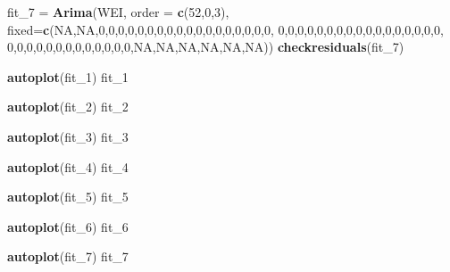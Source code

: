 \documentclass[]{article}
\newenvironment{Shaded}{\begin{snugshade}}{\end{snugshade}}
\newcommand{\KeywordTok}[1]{\textcolor[rgb]{0.13,0.29,0.53}{\textbf{#1}}}
\newcommand{\DataTypeTok}[1]{\textcolor[rgb]{0.13,0.29,0.53}{#1}}
\newcommand{\DecValTok}[1]{\textcolor[rgb]{0.00,0.00,0.81}{#1}}
\newcommand{\StringTok}[1]{\textcolor[rgb]{0.31,0.60,0.02}{#1}}
\newcommand{\OtherTok}[1]{\textcolor[rgb]{0.56,0.35,0.01}{#1}}
\newcommand{\NormalTok}[1]{#1}
\begin{document}
\begin{Shaded}
\begin{Highlighting}[]
\NormalTok{fit_}\DecValTok{7}\NormalTok{ =}\StringTok{ }\KeywordTok{Arima}\NormalTok{(WEI, }\DataTypeTok{order =} \KeywordTok{c}\NormalTok{(}\DecValTok{52}\NormalTok{,}\DecValTok{0}\NormalTok{,}\DecValTok{3}\NormalTok{), }
              \DataTypeTok{fixed=}\KeywordTok{c}\NormalTok{(}\OtherTok{NA}\NormalTok{,}\OtherTok{NA}\NormalTok{,}\DecValTok{0}\NormalTok{,}\DecValTok{0}\NormalTok{,}\DecValTok{0}\NormalTok{,}\DecValTok{0}\NormalTok{,}\DecValTok{0}\NormalTok{,}\DecValTok{0}\NormalTok{,}\DecValTok{0}\NormalTok{,}\DecValTok{0}\NormalTok{,}\DecValTok{0}\NormalTok{,}\DecValTok{0}\NormalTok{,}\DecValTok{0}\NormalTok{,}\DecValTok{0}\NormalTok{,}\DecValTok{0}\NormalTok{,}\DecValTok{0}\NormalTok{,}\DecValTok{0}\NormalTok{,}\DecValTok{0}\NormalTok{,}\DecValTok{0}\NormalTok{,}\DecValTok{0}\NormalTok{,}
              \DecValTok{0}\NormalTok{,}\DecValTok{0}\NormalTok{,}\DecValTok{0}\NormalTok{,}\DecValTok{0}\NormalTok{,}\DecValTok{0}\NormalTok{,}\DecValTok{0}\NormalTok{,}\DecValTok{0}\NormalTok{,}\DecValTok{0}\NormalTok{,}\DecValTok{0}\NormalTok{,}\DecValTok{0}\NormalTok{,}\DecValTok{0}\NormalTok{,}\DecValTok{0}\NormalTok{,}\DecValTok{0}\NormalTok{,}\DecValTok{0}\NormalTok{,}\DecValTok{0}\NormalTok{,}\DecValTok{0}\NormalTok{,}\DecValTok{0}\NormalTok{,}
\DecValTok{0}\NormalTok{,}\DecValTok{0}\NormalTok{,}\DecValTok{0}\NormalTok{,}\DecValTok{0}\NormalTok{,}\DecValTok{0}\NormalTok{,}\DecValTok{0}\NormalTok{,}\DecValTok{0}\NormalTok{,}\DecValTok{0}\NormalTok{,}\DecValTok{0}\NormalTok{,}\DecValTok{0}\NormalTok{,}\DecValTok{0}\NormalTok{,}\DecValTok{0}\NormalTok{,}\DecValTok{0}\NormalTok{,}\OtherTok{NA}\NormalTok{,}\OtherTok{NA}\NormalTok{,}\OtherTok{NA}\NormalTok{,}\OtherTok{NA}\NormalTok{,}\OtherTok{NA}\NormalTok{,}\OtherTok{NA}\NormalTok{))}
\KeywordTok{checkresiduals}\NormalTok{(fit_}\DecValTok{7}\NormalTok{)}


\KeywordTok{autoplot}\NormalTok{(fit_}\DecValTok{1}\NormalTok{)}
\NormalTok{fit_}\DecValTok{1}

\KeywordTok{autoplot}\NormalTok{(fit_}\DecValTok{2}\NormalTok{)}
\NormalTok{fit_}\DecValTok{2}

\KeywordTok{autoplot}\NormalTok{(fit_}\DecValTok{3}\NormalTok{)}
\NormalTok{fit_}\DecValTok{3}

\KeywordTok{autoplot}\NormalTok{(fit_}\DecValTok{4}\NormalTok{)}
\NormalTok{fit_}\DecValTok{4}

\KeywordTok{autoplot}\NormalTok{(fit_}\DecValTok{5}\NormalTok{)}
\NormalTok{fit_}\DecValTok{5}

\KeywordTok{autoplot}\NormalTok{(fit_}\DecValTok{6}\NormalTok{)}
\NormalTok{fit_}\DecValTok{6}

\KeywordTok{autoplot}\NormalTok{(fit_}\DecValTok{7}\NormalTok{)}
\NormalTok{fit_}\DecValTok{7}
\end{Highlighting}
\end{Shaded}
\end{document}
